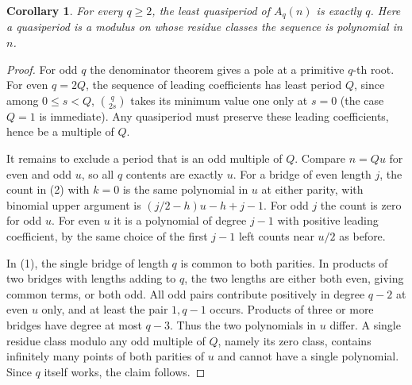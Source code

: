 \documentclass[11pt,letterpaper]{article}
\newtheorem{corollary}[theorem]{Corollary}
\begin{document}
\begin{corollary}
For every \(q\ge2\), the least quasiperiod of \(A_q(n)\) is exactly \(q\). Here a quasiperiod is a modulus on whose residue classes the sequence is polynomial in \(n\).
\end{corollary}
\begin{proof}
For odd \(q\) the denominator theorem gives a pole at a primitive \(q\)-th root. For even \(q=2Q\), the sequence of leading coefficients has least period \(Q\), since among \(0\le s<Q\), \(\binom q{2s}\) takes its minimum value one only at \(s=0\) (the case \(Q=1\) is immediate). Any quasiperiod must preserve these leading coefficients, hence be a multiple of \(Q\).

It remains to exclude a period that is an odd multiple of \(Q\). Compare \(n=Qu\) for even and odd \(u\), so all \(q\) contents are exactly \(u\). For a bridge of even length \(j\), the count in (2) with \(k=0\) is the same polynomial in \(u\) at either parity, with binomial upper argument is \((j/2-h)u-h+j-1\). For odd \(j\) the count is zero for odd \(u\). For even \(u\) it is a polynomial of degree \(j-1\) with positive leading coefficient, by the same choice of the first \(j-1\) left counts near \(u/2\) as before.

In (1), the single bridge of length \(q\) is common to both parities. In products of two bridges with lengths adding to \(q\), the two lengths are either both even, giving common terms, or both odd. All odd pairs contribute positively in degree \(q-2\) at even \(u\) only, and at least the pair \(1,q-1\) occurs. Products of three or more bridges have degree at most \(q-3\). Thus the two polynomials in \(u\) differ. A single residue class modulo any odd multiple of \(Q\), namely its zero class, contains infinitely many points of both parities of \(u\) and cannot have a single polynomial. Since \(q\) itself works, the claim follows.
\end{proof}
\end{document}
